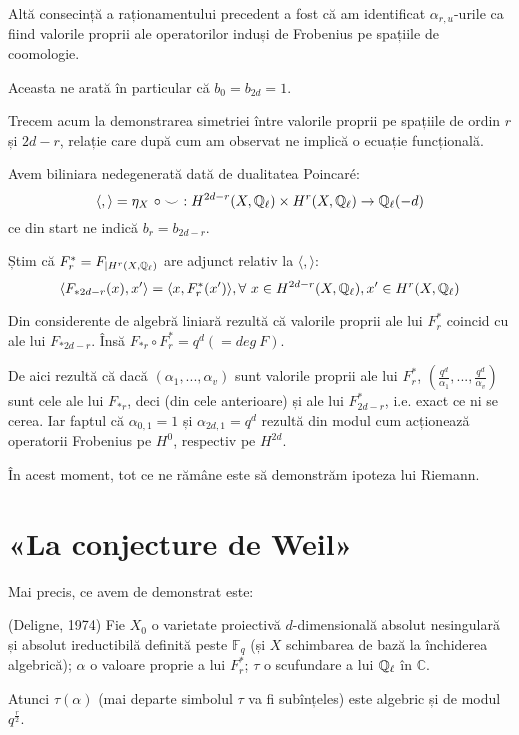 \documentclass[13pt,openany,oneside]{book}
\begin{document}
Altă consecință a raționamentului precedent a fost că am identificat $\alpha_{r,u}$-urile ca fiind valorile proprii ale operatorilor induși de Frobenius pe spațiile de coomologie.

Aceasta ne arată în particular că $b_0=b_{2d}=1$.

Trecem acum la demonstrarea simetriei între valorile proprii pe spațiile de ordin $r$ și $2d-r$, relație care după cum am observat ne implică o ecuație funcțională.

Avem biliniara nedegenerată dată de dualitatea Poincaré:
$$\langle,\rangle=\eta_X\ \circ \smile\ : H^{2d-r}(X,\mathbb{Q}_\ell) \times H^{r}(X,\mathbb{Q}_\ell) \rightarrow \mathbb{Q}_\ell(-d)$$
ce din start ne indică $b_r=b_{2d-r}$.

Știm că $F^*_r=F_{\mid  H^r(X,\mathbb{Q}_\ell)}$ are adjunct relativ la $\langle,\rangle$:
$$\langle F_{*2d-r}(x),x'\rangle=\langle x,F^*_r(x')\rangle, \forall\ x \in H^{2d-r}(X,\mathbb{Q}_\ell), x' \in H^{r}(X,\mathbb{Q}_\ell)$$

Din considerente de algebră liniară rezultă că valorile proprii ale lui $F^*_r$ coincid cu ale lui $F_{*2d-r}$. Însă $F_{*r} \circ F^*_r = q^d (=deg\ F)$.

De aici rezultă că dacă $(\alpha_1,...,\alpha_v)$ sunt valorile proprii ale lui $F^*_r$, $(\frac{q^d}{\alpha_1},...,\frac{q^d}{\alpha_v})$ sunt cele ale lui $F_{*r}$, deci (din cele anterioare) și ale lui $F^*_{2d-r}$, i.e. exact ce ni se cerea. Iar faptul că $\alpha_{0,1}=1$ și $\alpha_{2d,1}=q^d$ rezultă din modul cum acționează operatorii Frobenius pe $H^0$, respectiv pe $H^{2d}$.

În acest moment, tot ce ne rămâne este să demonstrăm ipoteza lui Riemann.

\chapter{«La conjecture de Weil»}

Mai precis, ce avem de demonstrat este:

\begin{teo}
(Deligne, 1974) Fie $X_0$ o varietate proiectivă $d$-dimensională absolut nesingulară și absolut ireductibilă definită peste $\mathbb{F}_q$ (și $X$ schimbarea de bază la închiderea algebrică); $\alpha$ o valoare proprie a lui $F^*_r$; $\tau$ o scufundare a lui $\mathbb{Q}_\ell$ în $\mathbb{C}$.

Atunci $\tau(\alpha)$ (mai departe simbolul $\tau$ va fi subînțeles) este algebric și de modul $q^{\frac{r}{2}}$.
\end{teo}
\end{document}
